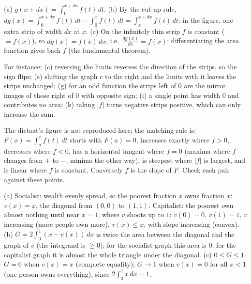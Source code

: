  (a) $g(x+dx)=\int_0^{x+dx}f(t)\,dt$. (b) By the cut-up rule, $dg(x)=\int_0^{x+dx}f(t)\,dt-\int_0^xf(t)\,dt=\int_x^{x+dx}f(t)\,dt$: in the figure, one extra strip of width $dx$ at $x$. (c) On the infinitely thin strip $f$ is constant ($=f(x)$), so $dg(x)=f(x)\,dx$, i.e.\ $\frac{dg(x)}{dx}=f(x)$: differentiating the area function gives back $f$ (the fundamental theorem).

 For instance: (c) reversing the limits reverses the direction of the strips, so the sign flips; (e) shifting the graph $c$ to the right and the limits with it leaves the strips unchanged; (g) for an odd function the strips left of $0$ are the mirror images of those right of $0$ with opposite sign; (i) a single point has width $0$ and contributes no area; (k) taking $|f|$ turns negative strips positive, which can only increase the sum.

 The dictaat's figure is not reproduced here; the matching rule is: $F(x)=\int_a^xf(t)\,dt$ starts with $F(a)=0$, increases exactly where $f>0$, decreases where $f<0$, has a horizontal tangent where $f=0$ (maxima where $f$ changes from $+$ to $-$, minima the other way), is steepest where $|f|$ is largest, and is linear where $f$ is constant. Conversely $f$ is the slope of $F$. Check each pair against these points.

 (a) Socialist: wealth evenly spread, so the poorest fraction $x$ owns fraction $x$: $v(x)=x$, the diagonal from $(0,0)$ to $(1,1)$. Capitalist: the poorest own almost nothing until near $x=1$, where $v$ shoots up to $1$: $v(0)=0$, $v(1)=1$, $v$ increasing (more people own more), $v(x)\le x$, with slope increasing (convex). (b) $G=2\int_0^1(x-v(x))\,dx$ is twice the area between the diagonal and the graph of $v$ (the integrand is $\ge0$); for the socialist graph this area is $0$, for the capitalist graph it is almost the whole triangle under the diagonal. (c) $0\le G\le1$: $G=0$ when $v(x)=x$ (complete equality); $G\to1$ when $v(x)=0$ for all $x<1$ (one person owns everything), since $2\int_0^1x\,dx=1$.

